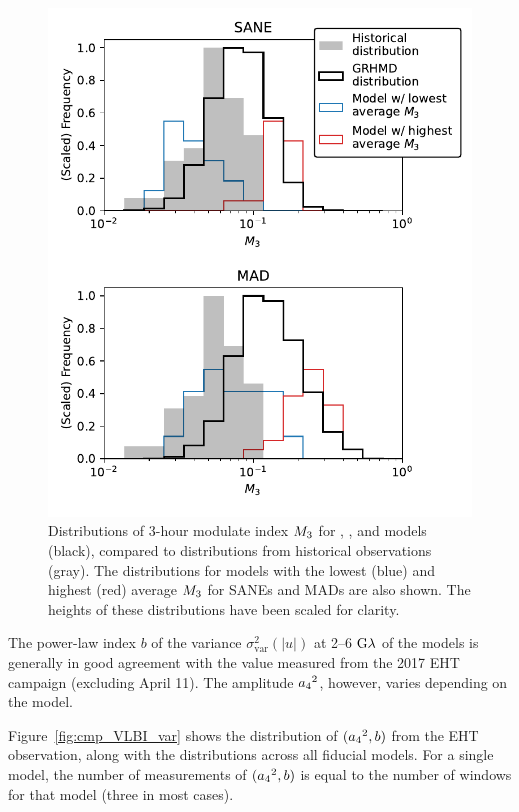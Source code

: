 \begin{figure}
  \centering
  \includegraphics[width=\columnwidth]{./figures/mi_hist.pdf}
  \caption{Distributions of 3-hour modulate index $M_{3}$ for \bhac, \kharma, and \hamr models (black), compared to distributions from historical observations (gray).
The distributions for models with the lowest (blue) and highest (red) average $M_{3}$ for SANEs and MADs are also shown.
The heights of these distributions have been scaled for clarity.
  }
  \label{fig:cmp_ALMA_var}
\end{figure}


The power-law index $b$ of the variance $\sigma_\text{var}^2 (|u|)$ at 2--6$~{\rm G}\lambda$ of the models is generally in good agreement with the value measured  from the 2017 EHT campaign (excluding April 11).
The amplitude ${a_4}^2$, however, varies depending on the model.

Figure~\ref{fig:cmp_VLBI_var} shows the distribution of $({a_4}^2, b)$ from the EHT observation, along with the distributions across all fiducial models.
For a single model, the number of measurements of $({a_4}^2, b)$ is equal to the number of windows for that model (three in most cases).


